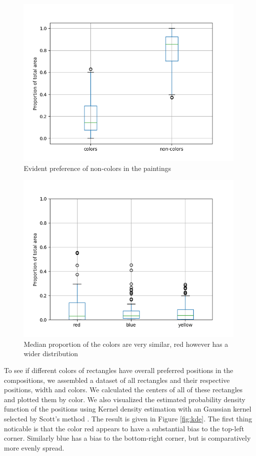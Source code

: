 \documentclass[serif,article,noparskip]{agse-thesis}
\begin{document}
\begin{figure}
\includegraphics[width=\linewidth]{images/colors-non-colors.png}
\caption{Evident preference of non-colors in the paintings}
\label{fig:colors-noncolors}
\end{figure}

\begin{figure} \includegraphics[width=\linewidth]{images/colors-rby.png}
\caption{Median proportion of the colors are very similar, red however has a
wider distribution} \label{fig:colors-rby} \end{figure}

To see if different colors of rectangles have overall preferred positions in the
compositions, we assembled a dataset of all rectangles and their respective
positions, width and colors. We calculated the centers of all of these
rectangles and plotted them by color. We also visualized the estimated
probability density function of the positions using Kernel density estimation
with an Gaussian kernel selected by Scott's method \cite{Terrell1992}. The
result is given in Figure \ref{fig:kde}. The first thing noticable is that the
color red appears to have a substantial bias to the top-left corner. Similarly
blue has a bias to the bottom-right corner, but is comparatively more evenly
spread.
\end{document}
